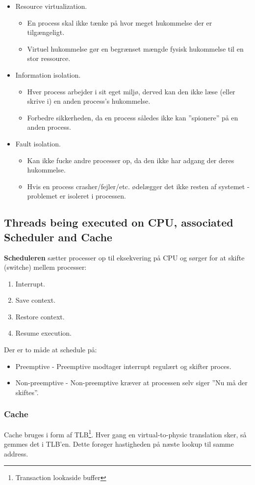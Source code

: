 \begin{itemize}
	\item Resource virtualization.
	\begin{itemize}
		\item En process skal ikke tænke på hvor meget hukommelse der er tilgængeligt.
		\item Virtuel hukommelse gør en begrænset mængde fysisk hukommelse til en stor ressource.
	\end{itemize}
	\item Information isolation.
	\begin{itemize}
		\item Hver process arbejder i sit eget miljø, derved kan den ikke læse (eller skrive i) en anden process's hukommelse.
		\item Forbedre sikkerheden, da en process således ikke kan ''spionere'' på en anden process.
	\end{itemize}
	\item Fault isolation.
	\begin{itemize}
		\item Kan ikke fucke andre processer op, da den ikke har adgang der deres hukommelse.
		\item Hvis en process crasher/fejler/etc. ødelægger det ikke resten af systemet - problemet er isoleret i processen.
	\end{itemize}
\end{itemize}

\subsection{Threads being executed on CPU, associated Scheduler and Cache}
\textbf{Scheduleren} sætter processer op til eksekvering på CPU og sørger for at skifte (switche) mellem processer:

\begin{enumerate}
	\item Interrupt.
	\item Save context.
	\item Restore context.
	\item Resume execution.
\end{enumerate}

Der er to måde at schedule på:

\begin{itemize}
	\item Preemptive - Preemptive modtager interrupt regulært og skifter proces.
	\item Non-preemptive - Non-preemptive kræver at processen selv siger ''Nu må der skiftes''.
\end{itemize}

\subsubsection{Cache}
Cache bruges i form af TLB\footnote{Transaction lookaside buffer}.
Hver gang en virtual-to-physic translation sker, så gemmes det i TLB’en. Dette forøger hastigheden på næste lookup til samme address.



